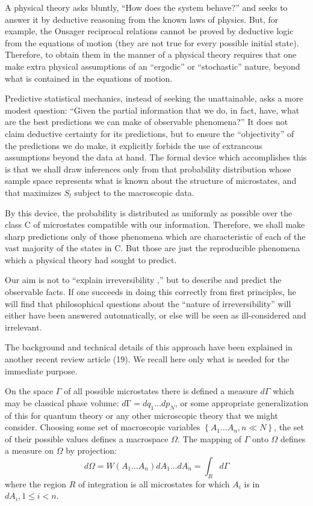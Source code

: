 \documentclass{article}
\begin{document}
A physical theory asks bluntly, ``How does the system behave?'' and seeks to answer it by deductive reasoning from the known laws of physics. But, for example, the Onsager reciprocal relations cannot be proved by deductive logic from the equations of motion (they are not true for every possible initial state). Therefore, to obtain them in the manner of a physical theory requires that one make extra physical assumptions of an ``ergodic'' or ``stochastic'' nature, beyond what is contained in the equations of motion.

Predictive statistical mechanics, instead of seeking the unattainable, asks a more modest question: ``Given the partial information that we do, in fact, have, what are the best predictions we can make of observable phenomena?'' It does not claim deductive certainty for its predictions, but to ensure the ``objectivity'' of the predictions we do make, it explicitly forbids the use of extrancous assumptions beyond the data at hand. The formal device which accomplishes this is that we shall draw inferences only from that probability distribution whose sample space represents what is known about the structure of microstates, and that maximizes $S_l$ subject to the macroscopic data.

By this device, the probability is distributed as uniformly as possible over the class C of microstates compatible with our information. Therefore, we shall make sharp predictions only of those phenomena which are characteristic of each of the vast majority of the states in C. But those are just the reproducible phenomena which a physical theory had sought to predict.

Our aim is not to ``explain irreversibility ,'' but to describe and predict the observable facts. If one succeeds in doing this correctly from first principles, he will find that philosophical questions about the ``nature of irreversibility'' will either have been answered automatically, or else will be seen as ill-considered and irrelevant. 

The background and technical details of this approach have been explained in another recent review article (19). We recall here only what is needed for the immediate purpose.

On the space $\Gamma$ of all possible microstates there is defined a measure $d \Gamma$ which may be classical phase volume: $d \mathrm{\Gamma}=d q_1 \ldots d p_N$, or some appropriate generalization of this for quantum theory or any other microscopic theory that we might consider. Choosing some set of macroscopic variables $\left\{A_1 \ldots A_n, n \ll N\right\}$, the set of their possible values defines a macrospace $\Omega$. The mapping of $\Gamma$ onto $\Omega$ defines a measure on $\Omega$ by projection:
$$
d \Omega=W\left(A_1 \ldots A_n\right) d A_1 \ldots d A_n=\int_R d \Gamma
$$
where the region $R$ of integration is all microstates for which $A_i$ is in $d A_i, 1 \leqslant i<n$.
\end{document}
